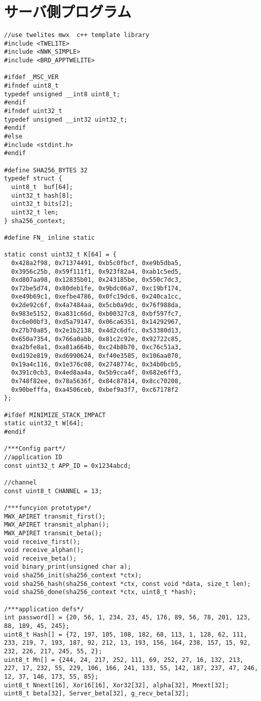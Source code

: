 \documentclass{thesis}
\begin{document}
\section{サーバ側プログラム}
\begin{lstlisting}
//use twelites mwx  c++ template library
#include <TWELITE>
#include <NWK_SIMPLE>
#include <BRD_APPTWELITE>

#ifdef _MSC_VER
#ifndef uint8_t
typedef unsigned __int8 uint8_t;
#endif
#ifndef uint32_t
typedef unsigned __int32 uint32_t;
#endif
#else
#include <stdint.h>
#endif

#define SHA256_BYTES 32
typedef struct {
  uint8_t  buf[64];
  uint32_t hash[8];
  uint32_t bits[2];
  uint32_t len;
} sha256_context;

#define FN_ inline static

static const uint32_t K[64] = {
  0x428a2f98, 0x71374491, 0xb5c0fbcf, 0xe9b5dba5,
  0x3956c25b, 0x59f111f1, 0x923f82a4, 0xab1c5ed5,
  0xd807aa98, 0x12835b01, 0x243185be, 0x550c7dc3,
  0x72be5d74, 0x80deb1fe, 0x9bdc06a7, 0xc19bf174,
  0xe49b69c1, 0xefbe4786, 0x0fc19dc6, 0x240ca1cc,
  0x2de92c6f, 0x4a7484aa, 0x5cb0a9dc, 0x76f988da,
  0x983e5152, 0xa831c66d, 0xb00327c8, 0xbf597fc7,
  0xc6e00bf3, 0xd5a79147, 0x06ca6351, 0x14292967,
  0x27b70a85, 0x2e1b2138, 0x4d2c6dfc, 0x53380d13,
  0x650a7354, 0x766a0abb, 0x81c2c92e, 0x92722c85,
  0xa2bfe8a1, 0xa81a664b, 0xc24b8b70, 0xc76c51a3,
  0xd192e819, 0xd6990624, 0xf40e3585, 0x106aa070,
  0x19a4c116, 0x1e376c08, 0x2748774c, 0x34b0bcb5,
  0x391c0cb3, 0x4ed8aa4a, 0x5b9cca4f, 0x682e6ff3,
  0x748f82ee, 0x78a5636f, 0x84c87814, 0x8cc70208,
  0x90befffa, 0xa4506ceb, 0xbef9a3f7, 0xc67178f2
};

#ifdef MINIMIZE_STACK_IMPACT
static uint32_t W[64];
#endif

/***Config part*/
//application ID
const uint32_t APP_ID = 0x1234abcd;

//channel
const uint8_t CHANNEL = 13;

/***funcyion prototype*/
MWX_APIRET transmit_first();
MWX_APIRET transmit_alphan();
MWX_APIRET transmit_beta();
void receive_first();
void receive_alphan();
void receive_beta();
void binary_print(unsigned char a);
void sha256_init(sha256_context *ctx);
void sha256_hash(sha256_context *ctx, const void *data, size_t len);
void sha256_done(sha256_context *ctx, uint8_t *hash);

/***application defs*/
int password[] = {20, 56, 1, 234, 23, 45, 176, 89, 56, 78, 201, 123, 88, 189, 45, 245};
uint8_t Hash[] = {72, 197, 105, 108, 182, 68, 113, 1, 128, 62, 111, 233, 219, 7, 193, 187, 92, 212, 13, 193, 156, 164, 238, 157, 15, 92, 232, 226, 217, 245, 55, 2};
uint8_t Mn[] = {244, 24, 217, 252, 111, 69, 252, 27, 16, 132, 213, 227, 17, 232, 55, 229, 106, 166, 241, 133, 55, 142, 187, 237, 47, 246, 12, 37, 146, 173, 55, 85};
uint8_t Nnext[16], Xor16[16], Xor32[32], alpha[32], Mnext[32];
uint8_t beta[32], Server_beta[32], g_recv_beta[32];


\end{lstlisting}
\end{document}
